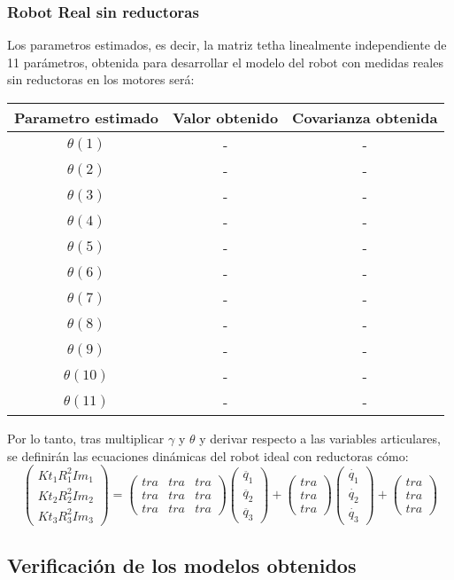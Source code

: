 \subsubsection{Robot Real sin reductoras}
Los parametros estimados, es decir, la matriz tetha linealmente independiente de 11 parámetros, obtenida para desarrollar el modelo del robot con medidas reales sin reductoras en los motores será:
\begin{center}
	\begin{tabular}{| c | c | c |}

		\hline
		Parametro estimado & Valor obtenido & Covarianza obtenida \\
		\hline
		$\theta(1) $ & - & - \\
		\hline
		$\theta(2) $ & - & - \\
		\hline
		$\theta(3) $ & - & - \\
		\hline
		$\theta(4) $ & - & - \\
		\hline
		$\theta(5) $ & - & - \\
		\hline
		$\theta(6) $ & - & - \\
		\hline
		$\theta(7) $ & - & - \\
		\hline
		$\theta(8) $ & - & - \\
		\hline
		$\theta(9) $ & - & - \\
		\hline
		$\theta(10) $ & - & - \\
		\hline
		$\theta(11) $ & - & - \\
		\hline
	\end{tabular}
\end{center}
Por lo tanto, tras multiplicar $\gamma$ y $\theta$ y derivar respecto a las variables articulares, se definirán las ecuaciones dinámicas del robot ideal con reductoras cómo:
\begin{equation}
	\begin{pmatrix}
	Kt_{1}R_{1}^{2}Im_{1} \\
	Kt_{2}R_{2}^{2}Im_{2} \\
	Kt_{3}R_{3}^{2}Im_{3}
	\end{pmatrix} =
	\begin{pmatrix}
	tra & tra & tra \\
	tra & tra & tra  \\
	tra & tra & tra
	\end{pmatrix}
	\begin{pmatrix}
	\ddot{q_{1}} \\
	\ddot{q_{2}}  \\
	\ddot{q_{3}}
	\end{pmatrix} +
	\begin{pmatrix}
	tra  \\
	tra   \\
	tra
	\end{pmatrix}
	\begin{pmatrix}
		\dot{q_{1}} \\
		\dot{q_{2}}  \\
		\dot{q_{3}}
	\end{pmatrix} +
\begin{pmatrix}
tra  \\
tra   \\
tra
\end{pmatrix}
\end{equation}



\newpage
\subsection{Verificación de los modelos obtenidos}
